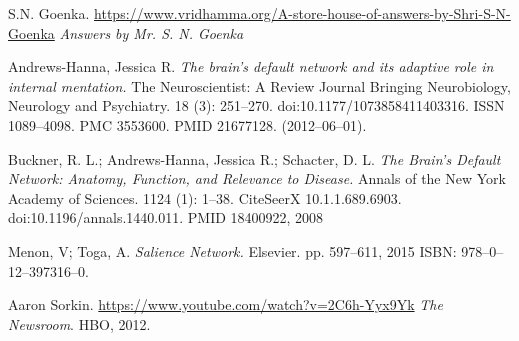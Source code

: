 \documentclass[twocolumn]{article}
\begin{document}
\begin{thebibliography}{9}
\raggedright

  S.N. Goenka.
  \url{https://www.vridhamma.org/A-store-house-of-answers-by-Shri-S-N-Goenka}
  \textit{Answers by Mr. S. N. Goenka}

  Andrews-Hanna, Jessica R.
  \textit{The brain’s default network and its adaptive role in internal mentation.}
  The Neuroscientist: A Review Journal Bringing Neurobiology, Neurology and
  Psychiatry. 18 (3): 251–270. doi:10.1177/1073858411403316. ISSN 1089–4098. PMC
  3553600. PMID 21677128. (2012–06–01).

  Buckner, R. L.; Andrews-Hanna, Jessica R.; Schacter, D. L.
  \textit{The Brain's Default Network: Anatomy, Function, and Relevance to Disease.}
  Annals of the New York Academy of Sciences. 1124 (1): 1–38. CiteSeerX
  10.1.1.689.6903. doi:10.1196/annals.1440.011. PMID 18400922, 2008

  Menon, V; Toga, A.
  \textit{Salience Network.}
  Elsevier. pp. 597–611, 2015
  ISBN: 978–0–12–397316–0.

  Aaron Sorkin.
  \url{https://www.youtube.com/watch?v=2C6h-Yyx9Yk}
  \textit{The Newsroom}.
  HBO, 2012.

\end{thebibliography}
\end{document}
